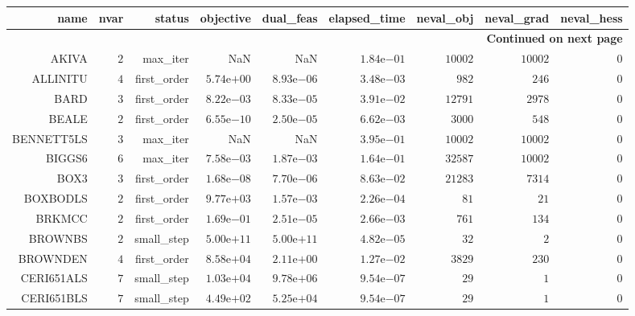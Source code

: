 \begin{longtable}{rrrrrrrrr}
\hline
name & nvar & status & objective & dual\_feas & elapsed\_time & neval\_obj & neval\_grad & neval\_hess \\\hline
\endhead
\hline
\multicolumn{9}{r}{{\bfseries Continued on next page}}\\
\hline
\endfoot
\endlastfoot
AKIVA & \(     2\) & max\_iter &       NaN &       NaN & \( 1.84\)e\(-01\) & \( 10002\) & \( 10002\) & \(     0\) \\
ALLINITU & \(     4\) & first\_order & \( 5.74\)e\(+00\) & \( 8.93\)e\(-06\) & \( 3.48\)e\(-03\) & \(   982\) & \(   246\) & \(     0\) \\
BARD & \(     3\) & first\_order & \( 8.22\)e\(-03\) & \( 8.33\)e\(-05\) & \( 3.91\)e\(-02\) & \( 12791\) & \(  2978\) & \(     0\) \\
BEALE & \(     2\) & first\_order & \( 6.55\)e\(-10\) & \( 2.50\)e\(-05\) & \( 6.62\)e\(-03\) & \(  3000\) & \(   548\) & \(     0\) \\
BENNETT5LS & \(     3\) & max\_iter &       NaN &       NaN & \( 3.95\)e\(-01\) & \( 10002\) & \( 10002\) & \(     0\) \\
BIGGS6 & \(     6\) & max\_iter & \( 7.58\)e\(-03\) & \( 1.87\)e\(-03\) & \( 1.64\)e\(-01\) & \( 32587\) & \( 10002\) & \(     0\) \\
BOX3 & \(     3\) & first\_order & \( 1.68\)e\(-08\) & \( 7.70\)e\(-06\) & \( 8.63\)e\(-02\) & \( 21283\) & \(  7314\) & \(     0\) \\
BOXBODLS & \(     2\) & first\_order & \( 9.77\)e\(+03\) & \( 1.57\)e\(-03\) & \( 2.26\)e\(-04\) & \(    81\) & \(    21\) & \(     0\) \\
BRKMCC & \(     2\) & first\_order & \( 1.69\)e\(-01\) & \( 2.51\)e\(-05\) & \( 2.66\)e\(-03\) & \(   761\) & \(   134\) & \(     0\) \\
BROWNBS & \(     2\) & small\_step & \( 5.00\)e\(+11\) & \( 5.00\)e\(+11\) & \( 4.82\)e\(-05\) & \(    32\) & \(     2\) & \(     0\) \\
BROWNDEN & \(     4\) & first\_order & \( 8.58\)e\(+04\) & \( 2.11\)e\(+00\) & \( 1.27\)e\(-02\) & \(  3829\) & \(   230\) & \(     0\) \\
CERI651ALS & \(     7\) & small\_step & \( 1.03\)e\(+04\) & \( 9.78\)e\(+06\) & \( 9.54\)e\(-07\) & \(    29\) & \(     1\) & \(     0\) \\
CERI651BLS & \(     7\) & small\_step & \( 4.49\)e\(+02\) & \( 5.25\)e\(+04\) & \( 9.54\)e\(-07\) & \(    29\) & \(     1\) & \(     0\) \\

\end{longtable}
